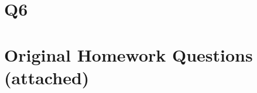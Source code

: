 \documentclass[final,3p,times]{elsarticle}
\begin{document}
\section{Q6}
	

	
\appendix

\section{Original Homework Questions (attached)}
	


%
%
%
%	
%	
%
%
%
%
%
%
\end{document}
